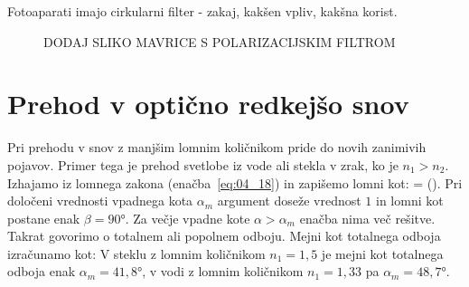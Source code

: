 \begin{remark}
Fotoaparati imajo cirkularni filter - zakaj, kakšen vpliv, kakšna korist.
\end{remark}
\begin{figure}[ht]
\centering
\caption{DODAJ SLIKO MAVRICE S POLARIZACIJSKIM FILTROM}
\label{fig:04_PolarizacijaFoto}
\end{figure}

\section{Prehod v optično redkejšo snov}
Pri prehodu v snov z manjšim lomnim količnikom pride do novih zanimivih pojavov.
Primer tega je prehod svetlobe iz vode ali stekla v zrak, ko je $n_1>n_2$.
Izhajamo iz lomnega zakona (enačba~\ref{eq:04_18}) in zapišemo lomni kot:
\beq
\beta = \arcsin \left(\sin \alpha\right).
\label{eq:04_52}
\eeq
Pri določeni vrednosti vpadnega kota $\alpha_m$ 
argument doseže vrednost $1$ in lomni kot
postane enak $\beta = 90\si{\degree}$. Za večje vpadne kote 
$\alpha> \alpha_m$ enačba nima več rešitve. Takrat govorimo o totalnem 
ali popolnem odboju. Mejni kot totalnega odboja izračunamo kot:
V steklu z lomnim količnikom $n_1=1,5$ je mejni kot totalnega odboja
enak $\alpha_m = 41,8\si{\degree}$, v vodi z lomnim količnikom 
$n_1 = 1,33$ pa $\alpha_m = 48,7\si{\degree}$.

